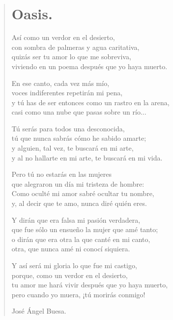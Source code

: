 \documentclass[11pt, portrait, twoside, notitlepage, openright]{book}
\begin{document}
\newpage
\begin{verse}
\begin{center}
\section{Oasis.}
\end{center}
Así como un verdor en el desierto,\\
con sombra de palmeras y agua caritativa,\\
quizás ser tu amor lo que me sobreviva,\\
viviendo en un poema después que yo haya muerto.
\newline

En ese canto, cada vez más mío,\\
voces indiferentes repetirán mi pena,\\
y tú has de ser entonces como un rastro en la arena,\\
casi como una nube que pasas sobre un río...
\newline

Tú serás para todos una desconocida,\\
tú que nunca sabrás cómo he sabido amarte;\\
y alguien, tal vez, te buscará en mi arte,\\
y al no hallarte en mi arte, te buscará en mi vida.
\newline

Pero tú no estarás en las mujeres\\
que alegraron un día mi tristeza de hombre:\\
Como oculté mi amor sabré ocultar tu nombre,\\
y, al decir que te amo, nunca diré quién eres.
\newline

Y dirán que era falsa mi pasión verdadera,\\
que fue sólo un ensueño la mujer que amé tanto;\\
o dirán que era otra la que canté en mi canto,\\
otra, que nunca amé ni conocí siquiera.
\newpage

Y así será mi gloria lo que fue mi castigo,\\
porque, como un verdor en el desierto,\\
tu amor me hará vivir después que yo haya muerto,\\
pero cuando yo muera, ¡tú morirás conmigo!
\newline

José Ángel Buesa.
\end{verse}
\end{document}
